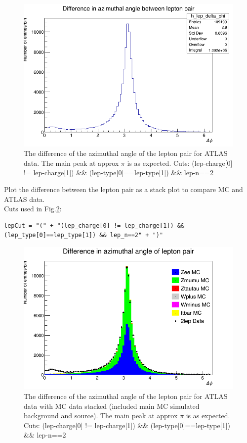 \begin{figure}[h!]
    \centering
    \includegraphics[width=0.85\linewidth]{plots/23-02-2021/2lep_delta-phi_0-7_23-02_09-43.png}
    \caption{The difference of the azimuthal angle of the lepton pair for ATLAS data.  The main peak at approx $\pi$ is as expected.  Cuts: (lep-charge[0] != lep-charge[1]) \&\& (lep-type[0]==lep-type[1]) \&\& lep-n==2}
    \label{fig:2lep_delta-phi_0-7_23-02_09-43}
\end{figure}

Plot the difference between the lepton pair as a stack plot to compare MC and ATLAS data.
\\
Cuts used in Fig.\ref{fig:All-stack-fast_delta-phi_(opp-charge_same-type_n=2)_0-6.3_23-02-21}:
\begin{lstlisting}
lepCut = "(" + "(lep_charge[0] != lep_charge[1]) && (lep_type[0]==lep_type[1]) && lep_n==2" + ")"
\end{lstlisting}

\begin{figure}[h!]
    \centering
    \includegraphics[width=0.85\linewidth]{plots/23-02-2021/All-stack-fast_delta-phi_(opp-charge_same-type_n=2)_0-6.3_23-02-21.png}
    \caption{The difference of the azimuthal angle of the lepton pair for ATLAS data with MC data stacked (included main MC simulated background and source).  The main peak at approx $\pi$ is as expected.  Cuts: (lep-charge[0] != lep-charge[1]) \&\& (lep-type[0]==lep-type[1]) \&\& lep-n==2}
    \label{fig:All-stack-fast_delta-phi_(opp-charge_same-type_n=2)_0-6.3_23-02-21}
\end{figure}


